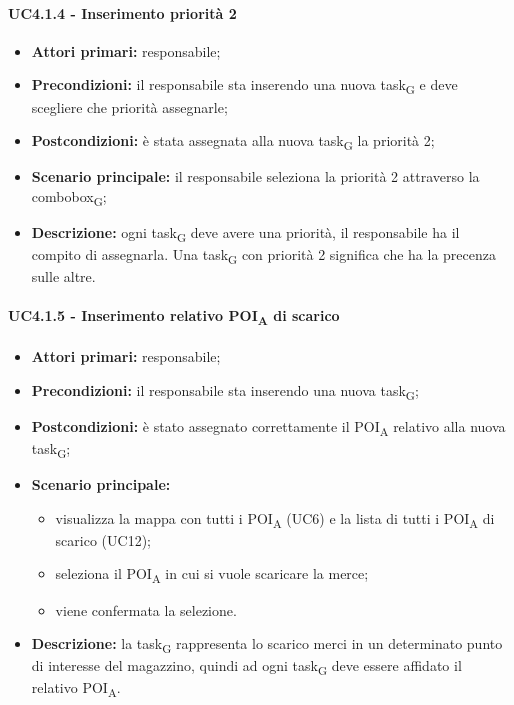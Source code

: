 \paragraph{UC4.1.4 - Inserimento priorità 2}
\begin{itemize}
	\item 	\textbf{Attori primari:} responsabile;
	\item 	\textbf{Precondizioni:} il responsabile sta inserendo una nuova task\textsubscript{G} e deve scegliere che priorità assegnarle;
	\item 	\textbf{Postcondizioni:} è stata assegnata alla nuova task\textsubscript{G} la priorità 2;
	\item 	\textbf{Scenario principale:} il responsabile seleziona la priorità 2 attraverso la combobox\textsubscript{G};
	\item 	\textbf{Descrizione:} ogni task\textsubscript{G} deve avere una priorità, il responsabile ha il compito di assegnarla. Una task\textsubscript{G} con priorità 2 significa che ha la precenza sulle altre.
	
\end{itemize}
\paragraph{UC4.1.5 - Inserimento relativo POI\textsubscript{A} di scarico}
\begin{itemize}
	\item 	\textbf{Attori primari:} responsabile;
	\item 	\textbf{Precondizioni:} il responsabile sta inserendo una nuova task\textsubscript{G};
	\item 	\textbf{Postcondizioni:} è stato assegnato correttamente il POI\textsubscript{A} relativo alla nuova task\textsubscript{G};
	\item 	\textbf{Scenario principale:}
	\begin{itemize}
		\item visualizza la mappa con tutti i POI\textsubscript{A} (UC6) e la lista di tutti i POI\textsubscript{A} di scarico (UC12);
		\item seleziona il POI\textsubscript{A} in cui si vuole scaricare la merce;
		\item viene confermata la selezione.
	\end{itemize}
	\item 	\textbf{Descrizione:} la task\textsubscript{G} rappresenta lo scarico merci in un determinato punto di interesse del magazzino, quindi ad ogni task\textsubscript{G} deve essere affidato il relativo POI\textsubscript{A}.
\end{itemize}





